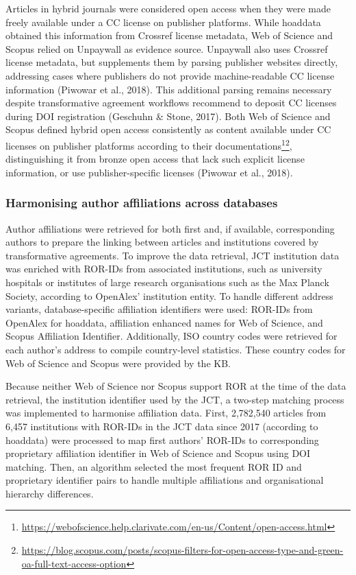 \documentclass[a4paper,man,floatsintext,longtable,noextraspace,10pt]{apa6}
\begin{document}
Articles in hybrid journals were considered open access when they were
made freely available under a CC license on publisher platforms. While
hoaddata obtained this information from Crossref license metadata, Web
of Science and Scopus relied on Unpaywall as evidence source. Unpaywall
also uses Crossref license metadata, but supplements them by parsing
publisher websites directly, addressing cases where publishers do not
provide machine-readable CC license information (Piwowar et al., 2018).
This additional parsing remains necessary despite transformative
agreement workflows recommend to deposit CC licenses during DOI
registration (Geschuhn \& Stone, 2017). Both Web of Science and Scopus
defined hybrid open access consistently as content available under CC
licenses on publisher platforms according to their
documentations\footnote{\url{https://webofscience.help.clarivate.com/en-us/Content/open-access.html}}\footnote{\url{https://blog.scopus.com/posts/scopus-filters-for-open-access-type-and-green-oa-full-text-access-option}},
distinguishing it from bronze open access that lack such explicit
license information, or use publisher-specific licenses (Piwowar et al.,
2018).

\subsubsection{Harmonising author affiliations across
databases}\label{harmonising-author-affiliations-across-databases}

Author affiliations were retrieved for both first and, if available,
corresponding authors to prepare the linking between articles and
institutions covered by transformative agreements. To improve the data
retrieval, JCT institution data was enriched with ROR-IDs from
associated institutions, such as university hospitals or institutes of
large research organisations such as the Max Planck Society, according
to OpenAlex' institution entity. To handle different address variants,
database-specific affiliation identifiers were used: ROR-IDs from
OpenAlex for hoaddata, affiliation enhanced names for Web of Science,
and Scopus Affiliation Identifier. Additionally, ISO country codes were
retrieved for each author's address to compile country-level statistics.
These country codes for Web of Science and Scopus were provided by the
KB.

Because neither Web of Science nor Scopus support ROR at the time of the
data retrieval, the institution identifier used by the JCT, a two-step
matching process was implemented to harmonise affiliation data. First,
2,782,540 articles from 6,457 institutions with ROR-IDs in the JCT data
since 2017 (according to hoaddata) were processed to map first authors'
ROR-IDs to corresponding proprietary affiliation identifier in Web of
Science and Scopus using DOI matching. Then, an algorithm selected the
most frequent ROR ID and proprietary identifier pairs to handle multiple
affiliations and organisational hierarchy differences.
\end{document}
